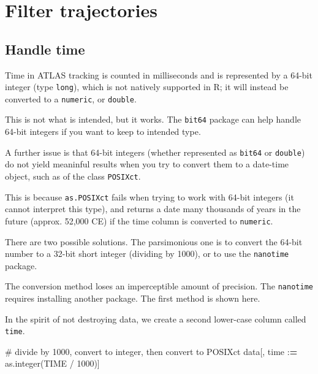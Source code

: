 \documentclass[]{scrreprt}
\newenvironment{Shaded}{}{}
\newcommand{\CommentTok}[1]{\textcolor[rgb]{0.00,0.50,0.00}{#1}}
\newcommand{\DecValTok}[1]{#1}
\newcommand{\ErrorTok}[1]{\textcolor[rgb]{1.00,0.00,0.00}{\textbf{#1}}}
\newcommand{\KeywordTok}[1]{\textcolor[rgb]{0.00,0.00,1.00}{#1}}
\newcommand{\NormalTok}[1]{#1}
\newcommand{\OperatorTok}[1]{#1}
\newcommand{\StringTok}[1]{\textcolor[rgb]{0.00,0.50,0.50}{#1}}
\begin{document}
\hypertarget{filter-trajectories}{%
\section{Filter trajectories}\label{filter-trajectories}}

\hypertarget{handle-time}{%
\subsection{Handle time}\label{handle-time}}

Time in ATLAS tracking is counted in milliseconds and is represented by a 64-bit integer (type \texttt{long}), which is not natively supported in R; it will instead be converted to a \texttt{numeric}, or \texttt{double}.

This is not what is intended, but it works. The \texttt{bit64} package can help handle 64-bit integers if you want to keep to intended type.

A further issue is that 64-bit integers (whether represented as \texttt{bit64} or \texttt{double}) do not yield meaninful results when you try to convert them to a date-time object, such as of the class \texttt{POSIXct}.

This is because \texttt{as.POSIXct} fails when trying to work with 64-bit integers (it cannot interpret this type), and returns a date many thousands of years in the future (approx. 52,000 CE) if the time column is converted to \texttt{numeric}.

There are two possible solutions. The parsimonious one is to convert the 64-bit number to a 32-bit short integer (dividing by 1000), or to use the \texttt{nanotime} package.

The conversion method loses an imperceptible amount of precision. The \texttt{nanotime} requires installing another package. The first method is shown here.

In the spirit of not destroying data, we create a second lower-case column called \texttt{time}.

\begin{Shaded}
\begin{Highlighting}[]
\CommentTok{# divide by 1000, convert to integer, then convert to POSIXct}
\NormalTok{data[, time }\OperatorTok{:}\ErrorTok{=}\StringTok{ }\KeywordTok{as.integer}\NormalTok{(TIME }\OperatorTok{/}\StringTok{ }\DecValTok{1000}\NormalTok{)]}
\end{Highlighting}
\end{Shaded}
\end{document}
